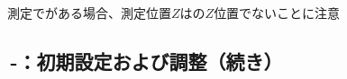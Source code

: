 \begin{marker}
\nameOutcutCenter 測定\MXIface で\EndFaceInChamfer がある場合、測定位置$Z$は\EndFace の$Z$位置でないことに注意
\end{marker}


\clearpage
\subsection{\,-：初期設定および調整（続き）}

